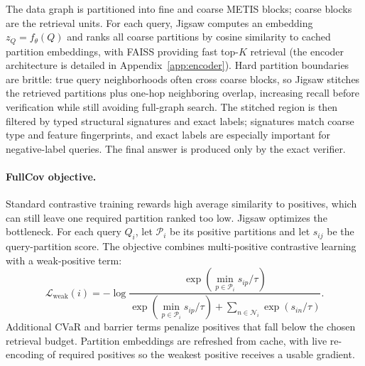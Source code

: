 \documentclass{article}
\begin{document}
The data graph is partitioned into fine and coarse METIS blocks; coarse blocks are the retrieval units. For each query, Jigsaw computes an embedding $z_Q=f_\theta(Q)$ and ranks all coarse partitions by cosine similarity to cached partition embeddings, with FAISS providing fast top-$K$ retrieval (the encoder architecture is detailed in Appendix~\ref{app:encoder}). Hard partition boundaries are brittle: true query neighborhoods often cross coarse blocks, so Jigsaw stitches the retrieved partitions plus one-hop neighboring overlap, increasing recall before verification while still avoiding full-graph search. The stitched region is then filtered by typed structural signatures and exact labels; signatures match coarse type and feature fingerprints, and exact labels are especially important for negative-label queries. The final answer is produced only by the exact verifier.

\paragraph{FullCov objective.}
Standard contrastive training rewards high average similarity to positives, which can still leave one required partition ranked too low. Jigsaw optimizes the bottleneck. For each query $Q_i$, let $\mathcal{P}_i$ be its positive partitions and let $s_{ij}$ be the query-partition score. The objective combines multi-positive contrastive learning with a weak-positive term:
\begin{equation}
\mathcal{L}_{\mathrm{weak}}(i)=-\log
\frac{\exp(\min_{p\in\mathcal{P}_i}s_{ip}/\tau)}
{\exp(\min_{p\in\mathcal{P}_i}s_{ip}/\tau)+\sum_{n\in\mathcal{N}_i}\exp(s_{in}/\tau)}.
\end{equation}
Additional CVaR and barrier terms penalize positives that fall below the chosen retrieval budget. Partition embeddings are refreshed from cache, with live re-encoding of required positives so the weakest positive receives a usable gradient.
\end{document}

